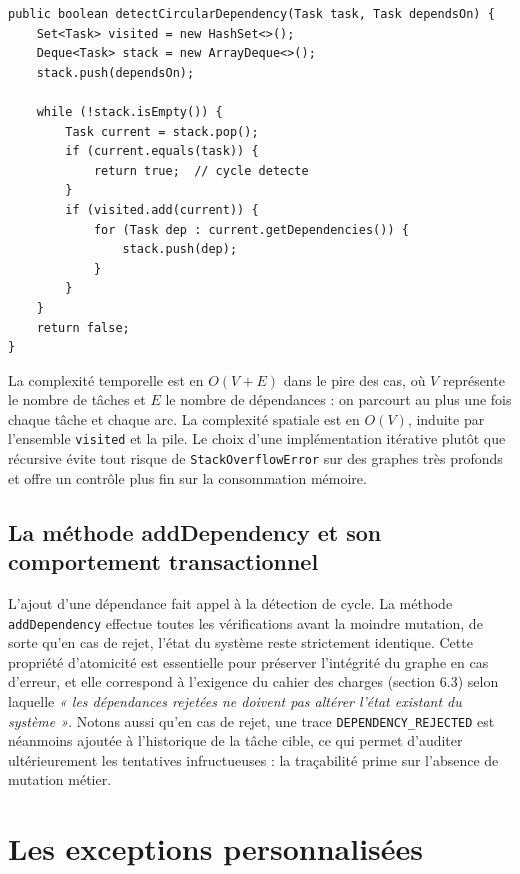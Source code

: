 \documentclass[11pt]{article}
\begin{document}
\begin{lstlisting}[caption={Détection de cycle par DFS itératif}]
public boolean detectCircularDependency(Task task, Task dependsOn) {
    Set<Task> visited = new HashSet<>();
    Deque<Task> stack = new ArrayDeque<>();
    stack.push(dependsOn);

    while (!stack.isEmpty()) {
        Task current = stack.pop();
        if (current.equals(task)) {
            return true;  // cycle detecte
        }
        if (visited.add(current)) {
            for (Task dep : current.getDependencies()) {
                stack.push(dep);
            }
        }
    }
    return false;
}
\end{lstlisting}

La complexité temporelle est en $O(V + E)$ dans le pire des cas, où $V$
représente le nombre de tâches et $E$ le nombre de dépendances : on
parcourt au plus une fois chaque tâche et chaque arc. La complexité
spatiale est en $O(V)$, induite par l'ensemble \texttt{visited} et la
pile. Le choix d'une implémentation itérative plutôt que récursive
évite tout risque de \texttt{StackOverflowError} sur des graphes très
profonds et offre un contrôle plus fin sur la consommation mémoire.

\subsection{La méthode addDependency et son comportement transactionnel}
L'ajout d'une dépendance fait appel à la détection de cycle. La méthode
\texttt{addDependency} effectue toutes les vérifications avant la moindre
mutation, de sorte qu'en cas de rejet, l'état du système reste
strictement identique. Cette propriété d'atomicité est essentielle pour
préserver l'intégrité du graphe en cas d'erreur, et elle correspond à
l'exigence du cahier des charges (section 6.3) selon laquelle
\textit{« les dépendances rejetées ne doivent pas altérer l'état
existant du système »}. Notons aussi qu'en cas de rejet, une trace
\texttt{DEPENDENCY\_REJECTED} est néanmoins ajoutée à l'historique de la
tâche cible, ce qui permet d'auditer ultérieurement les tentatives
infructueuses : la traçabilité prime sur l'absence de mutation
métier.

\section{Les exceptions personnalisées}
\end{document}
